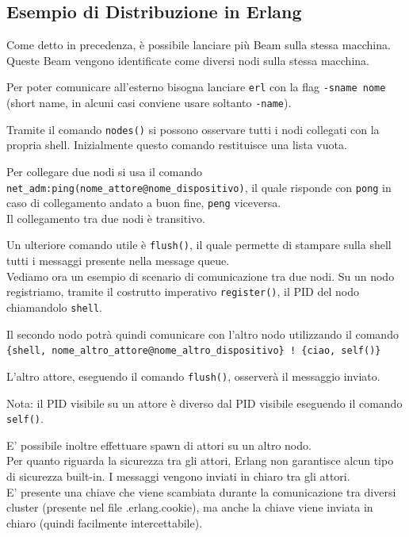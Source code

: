 \documentclass{article}
\begin{document}
\pagebreak

\subsection*{Esempio di Distribuzione in Erlang}
Come detto in precedenza, è possibile lanciare più Beam sulla stessa macchina. Queste Beam vengono identificate come diversi nodi sulla stessa macchina.

Per poter comunicare all'esterno bisogna lanciare \texttt{erl} con la flag \texttt{-sname nome} (short name, in alcuni casi conviene usare soltanto \texttt{-name}).

Tramite il comando \texttt{nodes()} si possono osservare tutti i nodi collegati con la propria shell. Inizialmente questo comando restituisce una lista vuota.

Per collegare due nodi si usa il comando \texttt{net\_adm:ping(nome\_attore@nome\_dispositivo)}, il quale risponde con \texttt{pong} in caso di collegamento andato a buon fine, \texttt{peng} viceversa.\\
Il collegamento tra due nodi è transitivo.

Un ulteriore comando utile è \texttt{flush()}, il quale permette di stampare sulla shell tutti i messaggi presente nella message queue.
\vspace{14pt}\\
Vediamo ora un esempio di scenario di comunicazione tra due nodi. Su un nodo registriamo, tramite il costrutto imperativo \texttt{register()}, il PID del nodo chiamandolo \texttt{shell}.

Il secondo nodo potrà quindi comunicare con l'altro nodo utilizzando il comando \\
\texttt{\{shell, nome\_altro\_attore@nome\_altro\_dispositivo\} ! \{ciao, self()\}}

L'altro attore, eseguendo il comando \texttt{flush()}, osserverà il messaggio inviato.

Nota: il PID visibile su un attore è diverso dal PID visibile eseguendo il comando \texttt{self()}.

E' possibile inoltre effettuare spawn di attori su un altro nodo.\vspace{14pt}\\
Per quanto riguarda la sicurezza tra gli attori, Erlang non garantisce alcun tipo di sicurezza built-in. I messaggi vengono inviati in chiaro tra gli attori.\\
E' presente una chiave che viene scambiata durante la comunicazione tra diversi cluster (presente nel file .erlang.cookie), ma anche la chiave viene inviata in chiaro (quindi facilmente intercettabile).
\end{document}
